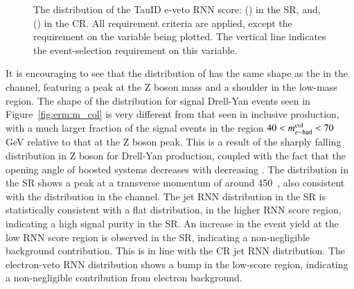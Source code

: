         \begin{figure}[!tb]
            \centering
            \caption{
                The distribution of the TauID e-veto RNN score: (\protect{}) in the SR, and,
                (\protect{}) in the CR. 
                All requirement criteria are applied, 
                except the requirement on the variable being plotted.
                The vertical line indicates the event-selection requirement on this variable.
            }
            \label{fig:erm:eveto_rnn}
        \end{figure}
        
        It is encouraging to see that the distribution of \mcolEtau has the same shape 
        as the \mcol in the \Zttmuhad channel, featuring a peak at the Z boson mass and 
        a shoulder in the low-mass region. The shape of the \mcolEtau distribution for signal 
        Drell-Yan events seen in Figure~\ref{fig:erm:m_col} is very different from that seen
        in inclusive production, with a much larger fraction of the signal events in the 
        region $40 < m_{e\mathrm{-}\mathrm{had}}^\mathrm{col} < 70$ GeV relative to that at the Z boson peak.  
        This is a result of the sharply falling distribution in Z boson \pT for Drell-Yan 
        production, coupled with the fact that the opening angle of boosted \teth systems 
        decreases with decreasing \mcolEtau.
        The \ptcolEtau distribution in the SR shows 
        a peak at a transverse momentum of around 450~\GeV, also consistent with the 
        \ptcol distribution in the \Zttmuhad channel. 
        The jet RNN distribution in the SR is statistically consistent with a flat distribution,
        in the higher RNN score region, indicating a high signal purity in the SR.
        An increase in the event yield at the low 
        RNN score region is observed in the SR, indicating a non-negligible 
        background contribution. This is in line with the CR jet RNN distribution.
        The electron-veto RNN distribution shows a bump in the low-score region, 
        indicating a non-negligible contribution from electron background.

